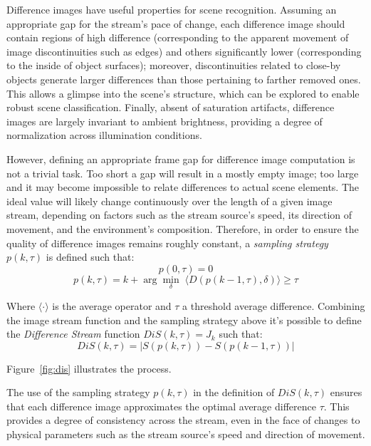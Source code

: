 \documentclass[twocolumn, 9pt,fleqn]{jsproceedings}
\begin{document}
Difference images have useful properties for scene recognition. Assuming an appropriate gap for the stream's pace of change, each difference image should contain regions of high difference (corresponding to the apparent movement of image discontinuities such as edges) and others significantly lower (corresponding to the inside of object surfaces); moreover, discontinuities related to close-by objects generate larger differences than those pertaining to farther removed ones. This allows a glimpse into the scene's structure, which can be explored to enable robust scene classification. Finally, absent of saturation artifacts, difference images are largely invariant to ambient brightness, providing a degree of normalization across illumination conditions.

However, defining an appropriate frame gap for difference image computation is not a trivial task. Too short a gap will result in a mostly empty image; too large and it may become impossible to relate differences to actual scene elements. The ideal value will likely change continuously over the length of a given image stream, depending on factors such as the stream source's speed, its direction of movement, and the environment's composition. Therefore, in order to ensure the quality of difference images remains roughly constant, a \textit{sampling strategy} $p(k, \tau)$ is defined such that:
\begin{equation}
p(0, \tau) = 0
\end{equation}
\begin{equation}
p(k, \tau) = k + \arg \min_{\delta} \; \langle D(p(k - 1, \tau), \delta) \rangle \geq \tau
\end{equation}

Where $\langle \cdot \rangle$ is the average operator and $\tau$ a threshold average difference. Combining the image stream function and the sampling strategy above it's possible to define the \textit{Difference Stream} function $DiS(k, \tau) = J_k$ such that:
\begin{equation}
DiS(k, \tau) = | S(p(k, \tau)) - S(p(k - 1, \tau)) |
\end{equation}

Figure~\ref{fig:dis} illustrates the process.

The use of the sampling strategy $p(k, \tau)$ in the definition of $DiS(k, \tau)$ ensures that each difference image approximates the optimal average difference $\tau$. This provides a degree of consistency across the stream, even in the face of changes to physical parameters such as the stream source's speed and direction of movement.
\end{document}
